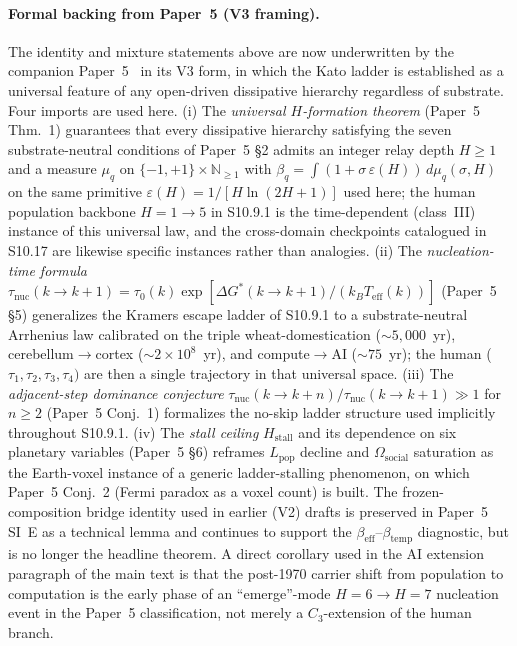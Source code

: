 \documentclass[11pt]{article}
\begin{document}
\paragraph{Formal backing from Paper~5 (V3 framing).}
The identity and mixture statements above are now underwritten by the companion Paper~5~\cite{Kato2026e} in its V3 form, in which the Kato ladder is established as a universal feature of any open-driven dissipative hierarchy regardless of substrate.  Four imports are used here.  (i) The \emph{universal $H$-formation theorem} (Paper~5 Thm.~1) guarantees that every dissipative hierarchy satisfying the seven substrate-neutral conditions of Paper~5 \S2 admits an integer relay depth $H\ge 1$ and a measure $\mu_q$ on $\{-1,+1\}\times\mathbb{N}_{\ge 1}$ with $\beta_q=\int(1+\sigma\,\varepsilon(H))\,d\mu_q(\sigma,H)$ on the same primitive $\varepsilon(H)=1/[H\ln(2H{+}1)]$ used here; the human population backbone $H{=}1\to 5$ in S10.9.1 is the time-dependent (class~III) instance of this universal law, and the cross-domain checkpoints catalogued in S10.17 are likewise specific instances rather than analogies.  (ii) The \emph{nucleation-time formula} $\tau_{\mathrm{nuc}}(k\to k{+}1)=\tau_0(k)\exp[\Delta G^{*}(k\to k{+}1)/(k_BT_{\mathrm{eff}}(k))]$ (Paper~5 \S5) generalizes the Kramers escape ladder of S10.9.1 to a substrate-neutral Arrhenius law calibrated on the triple wheat-domestication ($\sim 5{,}000$~yr), cerebellum$\to$cortex ($\sim 2\times 10^{8}$~yr), and compute$\to$AI ($\sim 75$~yr); the human ($\tau_1,\tau_2,\tau_3,\tau_4)$ are then a single trajectory in that universal space.  (iii) The \emph{adjacent-step dominance conjecture} $\tau_{\mathrm{nuc}}(k\to k{+}n)/\tau_{\mathrm{nuc}}(k\to k{+}1)\gg 1$ for $n\ge 2$ (Paper~5 Conj.~1) formalizes the no-skip ladder structure used implicitly throughout S10.9.1.  (iv) The \emph{stall ceiling} $H_{\mathrm{stall}}$ and its dependence on six planetary variables (Paper~5 \S6) reframes $L_{\mathrm{pop}}$ decline and $\Omega_{\mathrm{social}}$ saturation as the Earth-voxel instance of a generic ladder-stalling phenomenon, on which Paper~5 Conj.~2 (Fermi paradox as a voxel count) is built.  The frozen-composition bridge identity used in earlier (V2) drafts is preserved in Paper~5 SI~E as a technical lemma and continues to support the $\beta_{\mathrm{eff}}$--$\beta_{\mathrm{temp}}$ diagnostic, but is no longer the headline theorem.  A direct corollary used in the AI extension paragraph of the main text is that the post-1970 carrier shift from population to computation is the early phase of an ``emerge''-mode $H{=}6\to H{=}7$ nucleation event in the Paper~5 classification, not merely a $C_3$-extension of the human branch.
\end{document}
